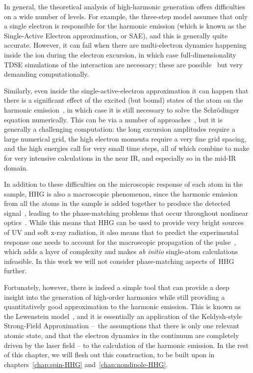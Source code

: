In general, the theoretical analysis of high-harmonic generation offers difficulties on a wide number of levels. For example, the three-step model assumes that only a single electron is responsible for the harmonic emission (which is known as the Single-Active Electron approximation, or SAE), and this is generally quite accurate. However, it can fail when there are multi-electron dynamics happening inside the ion during the electron excursion, in which case full-dimensionality TDSE simulations of the interaction are necessary; these are possible~\cite{spanner_full-dimensionality_2012} but very demanding computationally.


Similarly, even inside the single-active-electron approximation it can happen that there is a significant effect of the excited (but bound) states of the atom on the harmonic emission~\cite{schoun_cooper-tdse_2014, yanjun_bound-state-hhg_2011}, in which case it is still necessary to solve the Schrödinger equation numerically. This can be via a number of approaches~\cite{scrinzi_TDSE_chapter, patchkovskii_SCID_2016}, but it is generally a challenging computation: the long excursion amplitudes require a large numerical grid, the high electron momenta require a very fine grid spacing, and the high energies call for very small time steps, all of which combine to make for very intensive calculations in the near IR, and especially so in the mid-IR domain.


In addition to these difficulties on the microscopic response of each atom in the sample, HHG is also a macroscopic phenomenon, since the harmonic emission from all the atoms in the sample is added together to produce the detected signal~\cite{ popmintchev_phase-matching_2009, popmintchev_record_2012}, leading to the phase-matching problems that occur throughout nonlinear optics~\cite{boyd_nonlinear-optics}. While this means that HHG can be used to provide very bright sources of UV and soft x-ray radiation, it also means that to predict the experimental response one needs to account for the macroscopic propagation of the pulse~\cite{jin_hhg-propagation_2011}, which adds a layer of complexity and makes \textit{ab initio} single-atom calculations infeasible. In this work we will not consider phase-matching aspects of~HHG further.




Fortunately, however, there is indeed a simple tool that can provide a deep insight into the generation of high-order harmonics while still providing a quantitatively good approximation to the harmonic emission. This is known as the Lewenstein model~\cite{LewensteinHHG}, and it is essentially an application of the Keldysh-style Strong-Field Approximation --~the assumptions that there is only one relevant atomic state, and that the electron dynamics in the continuum are completely driven by the laser field -- to the calculation of the harmonic emission. In the rest of this chapter, we will flesh out this construction, to be built upon in chapters~\ref{chap:spin-HHG} and~\ref{chap:nondipole-HHG}.




